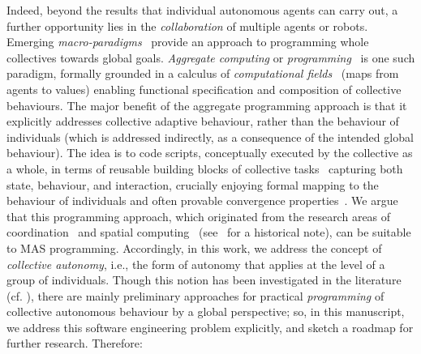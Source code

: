 Indeed, beyond the results that individual autonomous agents 
 can carry out, a further opportunity lies in the \emph{collaboration}
 of multiple agents or robots.
%
Emerging \emph{macro-paradigms}~\cite{DBLP:journals/corr/abs-1202-5509,viroli2019jlamp-si-coord}
 provide an approach to programming whole collectives
 towards global goals.
%
\emph{Aggregate computing} or \emph{programming}~\cite{DBLP:journals/computer/BealPV15,viroli2019jlamp-si-coord} is one such paradigm, formally grounded in a calculus of \emph{computational fields}~\cite{audrito2019tocl} (maps from agents to values) enabling functional specification and composition of collective behaviours. %
%
The major benefit of the aggregate programming approach
 is that it explicitly addresses 
 collective adaptive behaviour, rather than the behaviour of individuals (which is addressed indirectly, as a consequence of the intended global behaviour).
%
The idea is to code scripts, conceptually executed by the collective as a whole, in terms of reusable building blocks of collective tasks~\cite{DBLP:conf/saso/BealV14a}
 capturing both state, behaviour, and interaction,
 crucially enjoying formal mapping to the behaviour of individuals
 and often provable convergence properties~\cite{viroli2019jlamp-si-coord,DBLP:journals/tomacs/ViroliABDP18}.
%
We argue that this programming approach,
 which originated from the research areas of coordination~\cite{malone1994interdisciplinary} and spatial computing~\cite{DBLP:journals/corr/abs-1202-5509} (see~\cite{viroli2019jlamp-si-coord} for a historical note),
 can be suitable to MAS programming.
%
Accordingly, in this work, we address the concept of \emph{collective autonomy}, i.e., the form of autonomy that applies at the level of a group of individuals.
%
Though this notion has been investigated in the literature (cf. ), there are mainly preliminary approaches for practical \emph{programming} of collective autonomous behaviour by a global perspective; so, in this manuscript, we address this software engineering problem explicitly, and sketch a roadmap for further research.
%
Therefore: %
